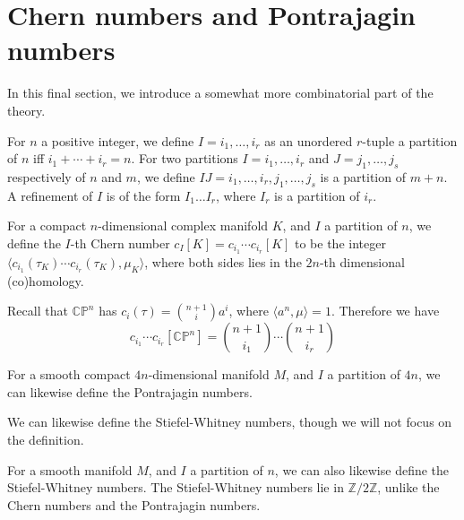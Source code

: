 \section{Chern numbers and Pontrajagin numbers}

	In this final section, we introduce a somewhat more combinatorial part of the theory. 
	\begin{defn}\label{Chern_numbers}
		For $n$ a positive integer, we define $I=i_1,\dots,i_r$ as an unordered $r$-tuple a partition of $n$ iff $i_1+\cdots+i_r=n$. For two partitions $I=i_1,\dots,i_r$ and $J=j_1,\dots,j_s$ respectively of $n$ and $m$, we define $IJ=i_1,\dots,i_r,j_1,\dots,j_s$ is a partition of $m+n$. A refinement of $I$ is of the form $I_1\dots I_r$, where $I_r$ is a partition of $i_r$. 
	\end{defn}
	\begin{defn}
		For a compact $n$-dimensional complex manifold $K$, and $I$ a partition of $n$, we define the $I$-th Chern number $c_I[K]=c_{i_1}\cdots c_{i_r}[K]$ to be the integer $\langle c_{i_1}(\tau_K)\cdots c_{i_r}(\tau_K),\mu_K\rangle$, where both sides lies in the $2n$-th dimensional (co)homology.
	\end{defn}
	\begin{remark}
		Recall that $\mathbb{CP}^n$ has $c_i(\tau)=\binom{n+1}{i}a^i$, where $\langle a^n,\mu\rangle=1$. Therefore we have 
		\[ c_{i_1}\cdots c_{i_r}[\mathbb{CP}^n]=\binom{n+1}{i_1}\cdots\binom{n+1}{i_r} \]
	\end{remark}
	\begin{defn}\label{Pontrajagin_numbers}
		For a smooth compact $4n$-dimensional manifold $M$, and $I$ a partition of $4n$, we can likewise define the Pontrajagin numbers. 
	\end{defn}
	We can likewise define the Stiefel-Whitney numbers, though we will not focus on the definition. 
	\begin{defn}\label{SW_numbers}
		For a smooth manifold $M$, and $I$ a partition of $n$, we can also likewise define the Stiefel-Whitney numbers. The Stiefel-Whitney numbers lie in $\mathbb{Z}/2\mathbb{Z}$, unlike the Chern numbers and the Pontrajagin numbers. 
	\end{defn}

